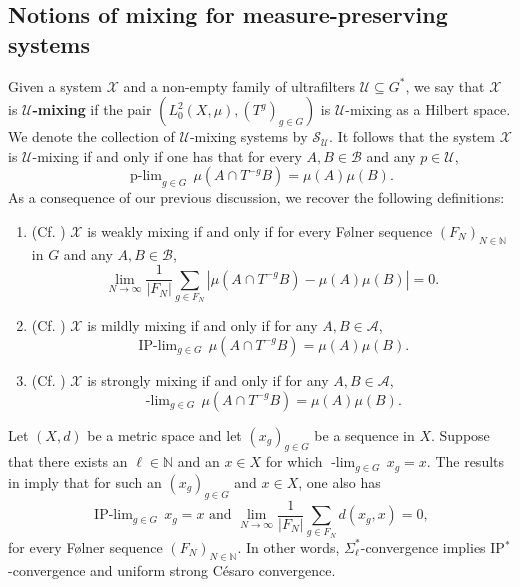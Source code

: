 \documentclass[graybox]{svmult}
\theoremstyle{definition}
\newcommand{\N}{\mathbb{N}}
\newcommand{\plimgG}[3]{\mathop {#1\text{-lim}}_{#2\in #3}\,}
\begin{document}
\subsection{Notions of mixing for measure-preserving systems}
Given a system $\mathcal{X}$ and a non-empty family of ultrafilters $\mathcal U\subseteq G^*$, we say that $\mathcal{X}$ is \textbf{$\mathcal U$-mixing} if the pair $(L^2_0(X,\mu), (T^g)_{g\in G})$ is $\mathcal U$-mixing as a Hilbert space.
We denote the collection of $\mathcal{U}$-mixing systems by $\mathcal{S}_\mathcal{U}$.
It follows that the system $\mathcal{X}$ is $\mathcal U$-mixing if and only if one has that for every $A,B\in\mathscr{B}$ and any $p\in\mathcal U$,
$$
\plimgG{p}{g}{G}\mu(A\cap T^{-g}B)=\mu(A)\mu(B).
$$
As a consequence of our previous discussion, we recover the following definitions:
\begin{enumerate}
    \item (Cf. \cite[Theorem 4.1]{BerRosWeakMixingActions1988}) $\mathcal{X}$ is weakly mixing if and only if for every F{\o}lner sequence $(F_N)_{N\in\N}$ in $G$ and any $A,B\in\mathscr{B}$,
    $$
\lim_{N\rightarrow\infty}\frac{1}{|F_N|}\sum_{g\in F_N}|\mu(A\cap T^{-g}B)-\mu(A)\mu(B)|=0. 
    $$
    \item (Cf. \cite[Proposition 9.22]{FBook}) $\mathcal{X}$ is mildly mixing  if and only if for any $A,B\in\mathcal A$,
    $$
    \mathop{\text{IP$^*$-lim}}_{g\in G}\,\mu(A\cap T^{-g}B)=\mu(A)\mu(B).
    $$
    \item (Cf. \cite[Theorem 1.6]{AlmostMixingOfAllOrders}) $\mathcal{X}$ is strongly mixing  if and only if for any $A,B\in\mathcal A$,
    $$
\mathop{\Sigma_\ell^*\text{-lim}}_{g\in G}\,\mu(A\cap T^{-g}B)=\mu(A)\mu(B).
    $$
\end{enumerate}
\begin{remark}
Let $(X,d)$ be a metric space and  let $(x_g)_{g\in G}$ be a sequence in $X$. Suppose that there exists an $\ell\in\N$ and an $x\in X$ for which 
$
\mathop{\Sigma_\ell^*\text{-lim}}_{g\in G}\,x_g=x$.
The results in \cite[Section 5]{AlmostMixingOfAllOrders} imply that for such an $(x_g)_{g\in G}$ and $x\in X$, one also has
$$
\mathop{\text{IP$^*$-lim}}_{g\in G}\,x_g=x\text{ and }\lim_{N\rightarrow\infty}\frac{1}{|F_N|}\sum_{g\in F_N}d(x_g,x)=0,
$$
for every F{\o}lner sequence $(F_N)_{N\in\N}$. In other words, $\Sigma_\ell^*$-convergence implies IP$^*$-convergence and  uniform strong C{\'e}saro convergence. 
\end{remark}
\end{document}
